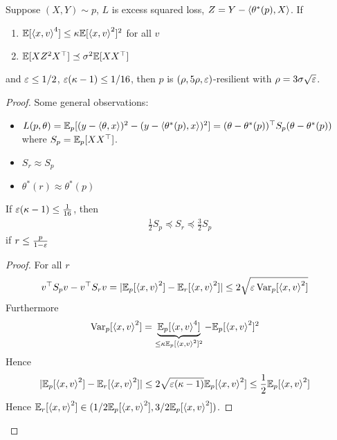 \begin{proposition}
  Suppose $(X, Y) \sim p$, $L$ is excess squared loss,
  $Z = Y - \braket{\theta^*(p), X}$.
  If
  \begin{enumerate}
    \item $\mathbb{E}[\braket{x, v}^4] \leq \kappa \mathbb{E}[\braket{x, v}^2]^2$ for all $v$
    \item $\mathbb{E}[X Z^2 X^\top] \preceq \sigma^2 \mathbb{E}[X X^\top]$
  \end{enumerate}
  and $\varepsilon \leq 1/2$, $\varepsilon(\kappa - 1) \leq 1 / 16$, then $p$
  is $(\rho, 5\rho, \varepsilon)$-resilient with $\rho = 3 \sigma \sqrt{\varepsilon}$.
\end{proposition}

\begin{proof}
  Some general observations:
  \begin{itemize}
    \item $L(p, \theta) = \mathbb{E}_p[(y - \braket{\theta, x})^2 - (y - \braket{\theta^*(p), x})^2]
      = (\theta - \theta^*(p))^\top S_p (\theta - \theta^*(p))$
      where $S_p = \mathbb{E}_p[X X^\top]$.
    \item $S_r \approx S_p$
    \item $\theta^*(r) \approx \theta^*(p)$
  \end{itemize}

  \begin{lemma}
    If $\varepsilon (\kappa - 1) \leq \frac{1}{16}$, then
    \begin{align}
      \frac{1}{2} S_p \preceq S_r \preceq \frac{3}{2} S_p
    \end{align}
    if $r \leq \frac{p}{1-\varepsilon}$
  \end{lemma}
  \begin{proof}
    For all $r$
    \begin{align}
      v^\top S_p v - v^\top S_r v
      &= \lvert \mathbb{E}_p[\braket{x,v}^2] - \mathbb{E}_r[\braket{x,v}^2]\rvert
      \leq 2 \sqrt{\varepsilon \operatorname{Var}_p[\braket{x,v}^2]}
    \end{align}
    Furthermore
    \begin{align}
      \operatorname{Var}_p[\braket{x,v}^2]
      &= \underbrace{\mathbb{E}_p[\braket{x,v}^4]}_{\leq \kappa \mathbb{E}_p[\braket{x,v}^2]^2}
      - \mathbb{E}_p[\braket{x,v}^2]^2
    \end{align}
    Hence
    \begin{align}
      \lvert \mathbb{E}_p[\braket{x,v}^2] - \mathbb{E}_r[\braket{x,v}^2]\rvert
      &\leq 2 \sqrt{\varepsilon (\kappa - 1)} \mathbb{E}_p[\braket{x,v}^2]
      \leq \frac{1}{2} \mathbb{E}_p[\braket{x,v}^2]
    \end{align}
    Hence $\mathbb{E}_r[\braket{x,v}^2] \in (1/2 \mathbb{E}_p[\braket{x,v}^2], 3/2 \mathbb{E}_p[\braket{x,v}^2])$.
  \end{proof}


\end{proof}

